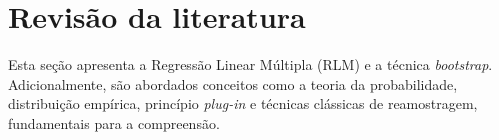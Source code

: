 \chapter{Revisão da literatura}\label{cap:desenvolvimento}
\label{cha:tecboot}
Esta seção apresenta a Regressão Linear Múltipla (RLM) e a técnica \textit{bootstrap}. Adicionalmente, são abordados conceitos como a teoria da probabilidade, distribuição empírica, princípio \textit{plug-in} e técnicas clássicas de reamostragem, fundamentais para a compreensão.


